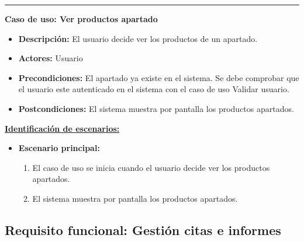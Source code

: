 \smallskip
\hrule height 1pt
\smallskip
\textbf{Caso de uso: Ver productos apartado}
\begin{itemize}\renewcommand{\labelitemi}{$\cdot$}
 \item \textbf{Descripción:} El usuario decide ver los productos de un apartado.
  \item \textbf{Actores:} Usuario
  \item \textbf{Precondiciones:} El apartado ya existe en el sistema. Se debe comprobar que el usuario este autenticado en el sistema con el caso de uso Validar usuario.
  \item \textbf{Postcondiciones:} El sistema muestra por pantalla los productos apartados.
\end{itemize}
\underline{\textbf{Identificación de escenarios:}}
\begin{itemize}\renewcommand{\labelitemi}{$\circ$}
 \item \textbf{Escenario principal:}
         \begin{enumerate}
          \item El caso de uso se inicia cuando el usuario decide ver los productos apartados.
	  \item El sistema muestra por pantalla los productos apartados.
         \end{enumerate}
\end{itemize}

\subsection{Requisito funcional: Gestión citas e informes}

